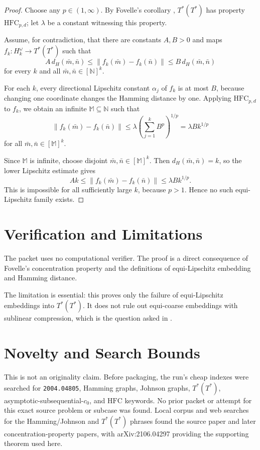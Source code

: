 \documentclass[11pt]{article}
\newcommand{\N}{\mathbb{N}}
\newcommand{\HFC}{\mathrm{HFC}}
\begin{document}
\begin{proof}
Choose any $p\in(1,\infty)$. By Fovelle's corollary
\cite{Fovelle2021}, $T^*(T^*)$ has property $\HFC_{p,d}$; let $\lambda$ be a
constant witnessing this property.

Assume, for contradiction, that there are constants $A,B>0$ and maps
$f_k:H_k^\omega\to T^*(T^*)$ such that
\[
  A\,d_H(\bar m,\bar n)\le \|f_k(\bar m)-f_k(\bar n)\|
  \le B\,d_H(\bar m,\bar n)
\]
for every $k$ and all $\bar m,\bar n\in[\N]^k$.

For each $k$, every directional Lipschitz constant $\alpha_j$ of $f_k$ is at
most $B$, because changing one coordinate changes the Hamming distance by
one. Applying $\HFC_{p,d}$ to $f_k$, we obtain an infinite
$\mathbb M\subseteq\N$ such that
\[
  \|f_k(\bar m)-f_k(\bar n)\|
  \le \lambda\left(\sum_{j=1}^k B^p\right)^{1/p}
  = \lambda B k^{1/p}
\]
for all $\bar m,\bar n\in[\mathbb M]^k$.

Since $\mathbb M$ is infinite, choose disjoint $\bar m,\bar n\in[\mathbb M]^k$.
Then $d_H(\bar m,\bar n)=k$, so the lower Lipschitz estimate gives
\[
  A k \le \|f_k(\bar m)-f_k(\bar n)\| \le \lambda B k^{1/p}.
\]
This is impossible for all sufficiently large $k$, because $p>1$. Hence no
such equi-Lipschitz family exists.
\end{proof}

\section*{Verification and Limitations}

The packet uses no computational verifier. The proof is a direct consequence
of Fovelle's concentration property and the definitions of equi-Lipschitz
embedding and Hamming distance.

The limitation is essential: this proves only the failure of
equi-Lipschitz embeddings into $T^*(T^*)$. It does not rule out equi-coarse
embeddings with sublinear compression, which is the question asked in
\cite{BLMS2020}.

\section*{Novelty and Search Bounds}

This is not an originality claim. Before packaging, the run's cheap indexes
were searched for \texttt{2004.04805}, Hamming graphs, Johnson graphs,
$T^*(T^*)$, asymptotic-subsequential-$c_0$, and $\HFC$ keywords. No prior
packet or attempt for this exact source problem or subcase was found. Local
corpus and web searches for the Hamming/Johnson and $T^*(T^*)$ phrases found
the source paper and later concentration-property papers, with
arXiv:2106.04297 providing the supporting theorem used here.
\end{document}
